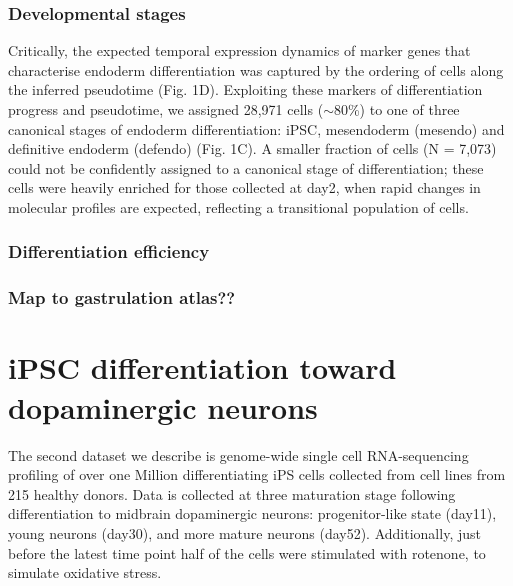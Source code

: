 \subsubsection{Developmental stages}
 
Critically, the expected temporal expression dynamics of marker genes that characterise endoderm differentiation was captured by the ordering of cells along the inferred pseudotime (Fig. 1D). 
Exploiting these markers of differentiation progress and pseudotime, we assigned 28,971 cells ($\sim$80\%) to one of three canonical stages of endoderm differentiation: iPSC, mesendoderm (mesendo) and definitive endoderm (defendo) (Fig. 1C). 
A smaller fraction of cells (N = 7,073) could not be confidently assigned to a canonical stage of differentiation; these cells were heavily enriched for those collected at day2, when rapid changes in molecular profiles are expected, reflecting a transitional population of cells.

\subsubsection{Differentiation efficiency}

\subsubsection{Map to gastrulation atlas??}

\newpage


\section{iPSC differentiation toward dopaminergic neurons}

The second dataset we describe is genome-wide single cell RNA-sequencing profiling of over one Million differentiating iPS cells collected from cell lines from 215 healthy donors. 
Data is collected at three maturation stage following differentiation to midbrain dopaminergic neurons: progenitor-like state (day11), young neurons (day30), and more mature neurons (day52). 
Additionally, just before the latest time point half of the cells were stimulated with rotenone, to simulate oxidative stress. 

\vspace{5mm}

